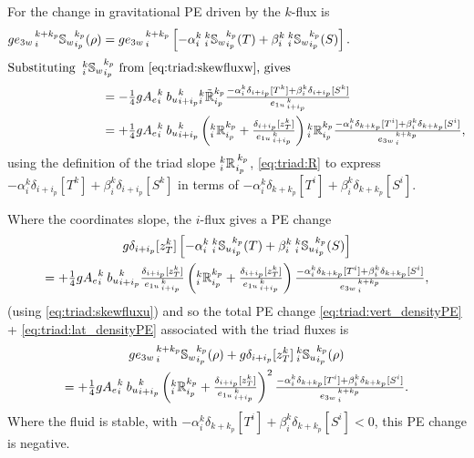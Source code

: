 For the change in gravitational PE driven by the $k$-flux is
\begin{align}
  \label{eq:triad:vert_densityPE}
  g {e_{3w}}_{\,i}^{\,k+k_p}{\mathbb{S}_w}_{i_p}^{k_p} (\rho)
  &=g {e_{3w}}_{\,i}^{\,k+k_p}\left[-\alpha _i^k {\:}_i^k
    {\mathbb{S}_w}_{i_p}^{k_p} (T) + \beta_i^k {\:}_i^k
    {\mathbb{S}_w}_{i_p}^{k_p} (S) \right]. \notag \\
\intertext{Substituting  ${\:}_i^k {\mathbb{S}_w}_{i_p}^{k_p}$ from
  \eqref{eq:triad:skewfluxw}, gives}
 &=-\textstyle\frac{1}{4} g{A_e}_i^k{\: }{b_u}_{i+i_p}^k {_i^k\tilde{\mathbb{R}}_{i_p}^{k_p}}
\frac{ -\alpha _i^k\delta_{i+ i_p}[T^k]+ \beta_i^k\delta_{i+ i_p}[S^k]} { {e_{1u}}_{\,i + i_p}^{\,k} } \notag \\
 &=+\textstyle\frac{1}{4} g{A_e}_i^k{\: }{b_u}_{i+i_p}^k
     \left({_i^k\mathbb{R}_{i_p}^{k_p}}+\frac{\delta_{i+i_p}[z_T^k]}{{e_{1u}}_{\,i + i_p}^{\,k}}\right) {_i^k\mathbb{R}_{i_p}^{k_p}}
\frac{-\alpha_i^k \delta_{k+ k_p}[T^i]+ \beta_i^k\delta_{k+ k_p}[S^i]} {{e_{3w}}_{\,i}^{\,k+k_p}},
\end{align}
using the definition of the triad slope ${}_{i}^{k}{\mathbb{R}_{}}_{i_p}^{\,k_p}$,
\eqref{eq:triad:R} to express $-\alpha _i^k\delta_{i+ i_p}[T^k]+
\beta_i^k\delta_{i+ i_p}[S^k]$ in terms of  $-\alpha_i^k \delta_{k+
  k_p}[T^i]+ \beta_i^k\delta_{k+ k_p}[S^i]$.

Where the coordinates slope, the $i$-flux gives a PE change
\begin{multline}
  \label{eq:triad:lat_densityPE}
 g \delta_{i+i_p}[z_T^k]
\left[
-\alpha _i^k {\:}_i^k {\mathbb{S}_u}_{i_p}^{k_p} (T) + \beta_i^k {\:}_i^k {\mathbb{S}_u}_{i_p}^{k_p} (S)
\right] \\
= +\textstyle\frac{1}{4} g{A_e}_i^k{\: }{b_u}_{i+i_p}^k
     \frac{\delta_{i+i_p}[z_T^k]}{{e_{1u}}_{\,i + i_p}^{\,k}}
\left({_i^k\mathbb{R}_{i_p}^{k_p}}+\frac{\delta_{i+i_p}[z_T^k]}{{e_{1u}}_{\,i + i_p}^{\,k}}\right)
\frac{-\alpha_i^k \delta_{k+ k_p}[T^i]+ \beta_i^k\delta_{k+ k_p}[S^i]} {{e_{3w}}_{\,i}^{\,k+k_p}},
\end{multline}
(using \eqref{eq:triad:skewfluxu}) and so the total PE change
\eqref{eq:triad:vert_densityPE} + \eqref{eq:triad:lat_densityPE} associated with the triad fluxes is
\begin{multline}
  \label{eq:triad:tot_densityPE}
  g{e_{3w}}_{\,i}^{\,k+k_p}{\mathbb{S}_w}_{i_p}^{k_p} (\rho) +
g\delta_{i+i_p}[z_T^k] {\:}_i^k {\mathbb{S}_u}_{i_p}^{k_p} (\rho) \\
= +\textstyle\frac{1}{4} g{A_e}_i^k{\: }{b_u}_{i+i_p}^k
     \left({_i^k\mathbb{R}_{i_p}^{k_p}}+\frac{\delta_{i+i_p}[z_T^k]}{{e_{1u}}_{\,i + i_p}^{\,k}}\right)^2
\frac{-\alpha_i^k \delta_{k+ k_p}[T^i]+ \beta_i^k\delta_{k+ k_p}[S^i]} {{e_{3w}}_{\,i}^{\,k+k_p}}.
\end{multline}
Where the fluid is stable, with $-\alpha_i^k \delta_{k+ k_p}[T^i]+
\beta_i^k\delta_{k+ k_p}[S^i]<0$, this PE change is negative.

